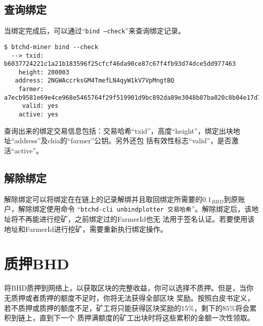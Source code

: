 \subsection{查询绑定}
\begin{flushleft}
    当绑定完成后，可以通过``\texttt{bind --check}''来查询绑定记录。
\end{flushleft}
\scriptsize
\begin{verbatim}
$ btchd-miner bind --check
  --> txid: b6037724221c1a21b183596f25cfcf46da90ce87c67f4fb93d74dce5dd977463
    height: 200003
   address: 2NGWAccrksGM4TmefLN4qyW1kV7VpMngtBQ
    farmer: a7ecb9581e69e4ce968e5465764f29f519901d9bc892da89e3048b87ba820c8b04e17d726bfbb236e3f0e33f8a83851e
     valid: yes
    active: yes
\end{verbatim}
\normalsize
\begin{flushleft}
    查询出来的绑定交易信息包括：交易哈希``txid''，高度``height''，绑定出块地址``address''及chia的``farmer''公钥。另外还包
    括有效性标志``valid''，是否激活``active''。
\end{flushleft}
\subsection{解除绑定}
\begin{flushleft}
    解除绑定可以将绑定在在链上的记录解绑并且取回绑定所需要的$0.1_{BHD}$到原账户，解除绑定使用命令
    ``\texttt{btchd-cli unbindplotter 交易哈希}''。解除绑定后，该地址将不再能进行挖矿，之前绑定过的FarmerId也无
    法用于签名认证。若要使用该地址和FarmerId进行挖矿，需要重新执行绑定操作。
\end{flushleft}
\section{质押BHD}
\begin{flushleft}
    将BHD质押到网络上，以获取区块的完整收益，你可以选择不质押。但是，当你无质押或者质押的额度不足时，你将无法获得全部区块
    奖励。按照白皮书定义，若不质押或质押的额度不足，矿工将只能获得区块奖励的$15\%$，剩下的$85\%$将会累积到链上，直到下一个
    质押满额度的矿工出块时将这些累积的金额一次性领取。
\end{flushleft}
